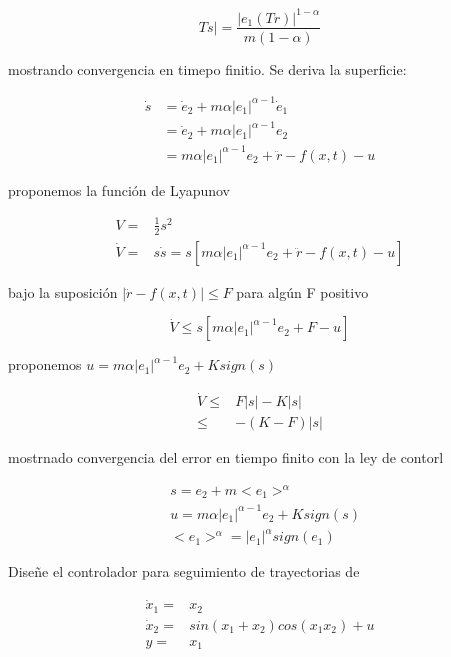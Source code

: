 \begin{equation*}
    Ts|=\frac{|e_1(Tr)|^{1-\alpha}}{m(1-\alpha)}
\end{equation*}

mostrando convergencia en timepo finitio. Se deriva la superficie:

\begin{equation*}
    \begin{aligned}
        \dot{s}&=\dot{e}_2+m\alpha|e_1|^{\alpha-1}\dot{e}_1\\
            &=\dot{e}_2+m\alpha|e_1|^{\alpha-1}e_2\\
            &=m\alpha|e_1|^{\alpha-1}e_2+\ddot{r}-f(x,t)-u
    \end{aligned}
\end{equation*}

proponemos la función de Lyapunov

\begin{equation*}
    \begin{aligned}
        V=&\frac{1}{2}s^2\\
        \dot{V}=&s\dot{s} =s[m\alpha|e_1|^{\alpha-1}e_2+\ddot{r}-f(x,t)-u]
    \end{aligned}
\end{equation*}

bajo la suposición $|\ddot{r}-f(x,t)|\leq F$ para algún F positivo

\begin{equation*}
    \dot{V} \leq s[m\alpha |e_1|^{\alpha-1}e_2+F-u]
\end{equation*}

proponemos $u=m\alpha |e_1|^{\alpha-1}e_2+Ksign(s)$

\begin{equation*}
    \begin{aligned}
        \dot{V} \leq& F|s|-K|s|\\
            \leq & -(K-F)|s|
    \end{aligned}
\end{equation*}

mostrnado convergencia del error en tiempo finito con la ley de contorl

\begin{equation*}
    \begin{aligned}
        &s=e_2+m<e_1>^\alpha\\
        &u= m\alpha|e_1|^{\alpha-1}e_2 + Ksign(s)\\
        &<e_1>^\alpha=|e_1|^\alpha sign(e_1)
    \end{aligned}
\end{equation*}

\begin{flushright}
\end{flushright}

Diseñe el controlador para seguimiento de trayectorias de

\begin{equation*}
    \begin{aligned}
        \dot{x}_1=&x_2\\
        \dot{x}_2=&sin(x_1+x_2)cos(x_1x_2)+u\\
        y=&x_1
    \end{aligned}
\end{equation*}